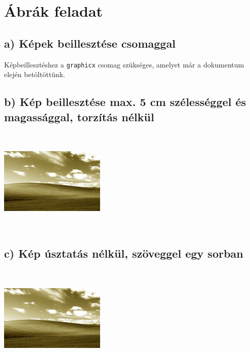 \documentclass[a4paper,12pt]{article}
\begin{document}
\tableofcontents %
\listoffigures   %
\listoftables    %

\newpage

\section{Ábrák feladat}

\subsection{a) Képek beillesztése csomaggal}
Képbeillesztéshez a \texttt{graphicx} csomag szükséges, amelyet már a dokumentum elején betöltöttünk.

\subsection{b) Kép beillesztése max. 5 cm szélességgel és magassággal, torzítás nélkül}
\includegraphics[width=5cm,height=5cm,keepaspectratio]{szepia.jpg}

\subsection{c) Kép úsztatás nélkül, szöveggel egy sorban}
\lipsum[1] %
\includegraphics[width=5cm,height=5cm,keepaspectratio]{szepia.jpg}
\lipsum[2] %
\end{document}
